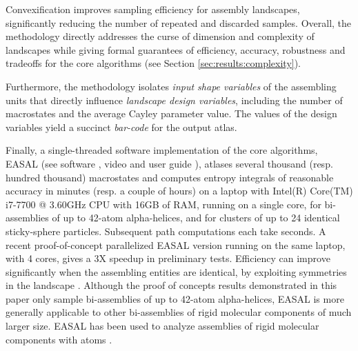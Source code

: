 \documentclass[]{article}
\begin{document}
Convexification improves sampling efficiency for assembly landscapes,
significantly reducing the number of repeated and discarded samples. Overall,
the methodology directly addresses the curse of dimension and complexity of
landscapes while giving formal guarantees of efficiency, accuracy, robustness
and tradeoffs for the core algorithms (see Section
\ref{sec:results:complexity}). 

Furthermore, the methodology isolates \emph{input shape variables} of the
assembling units that directly influence \emph{landscape design variables},
including the number of macrostates and the average Cayley parameter value.
The values of the design variables yield a succinct \emph{bar-code} for the
output atlas.

Finally, a single-threaded software implementation of the core algorithms,
EASAL \cite{Ozkan:toms} (see software \cite{easalSoftware}, video
\cite{easalVideo} and user guide \cite{easalUserGuide}), atlases several
thousand (resp. hundred thousand) macrostates and computes entropy integrals of
reasonable accuracy in minutes (resp. a couple of hours) on a laptop with
Intel(R) Core(TM) i7-7700 @ 3.60GHz CPU with 16GB of RAM, running on a single
core, for bi-assemblies of up to 42-atom alpha-helices, and for clusters of up
to 24 identical sticky-sphere particles. Subsequent path computations each take
seconds. A recent proof-of-concept parallelized EASAL version running on the
same laptop, with 4 cores, gives a 3X speedup in preliminary tests. Efficiency
can improve significantly when the assembling entities are identical, by
exploiting symmetries in the landscape \cite{sym8010005}. Although the proof of
concepts results demonstrated in this paper only sample bi-assemblies of up to
42-atom alpha-helices, EASAL is more generally applicable to other
bi-assemblies of rigid molecular components of much larger size. EASAL has been
used to analyze assemblies of rigid molecular components with 
atoms \cite{Wu2012,virus2019}.
\end{document}
